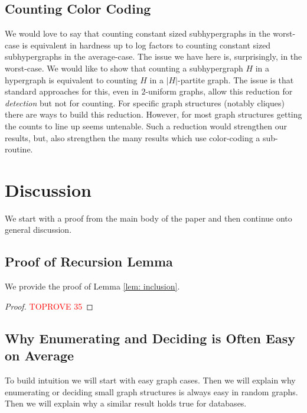 \documentclass[11pt,letterpaper,pdftex]{article}
\begin{document}
\subsection{Counting Color Coding}

We would love to say that counting constant sized subhypergraphs in the worst-case is equivalent in hardness up to log factors to counting constant sized subhypergraphs in the average-case. The issue we have here is, surprisingly, in the worst-case. We would like to show that counting a subhypergraph $H$ in a hypergraph is equivalent to counting $H$ in a $|H|$-partite graph. The issue is that standard approaches for this, even in $2$-uniform graphs, allow this reduction for \emph{detection} but not for counting. For specific graph structures (notably cliques) there are ways to build this reduction. However, for most graph structures getting the counts to line up seems untenable. Such a reduction would strengthen our results, but, also strengthen the many results which use color-coding a sub-routine.  
\let\realbibitem=\bibitem
\def\bibitem{\par \vspace{-0.5ex}\realbibitem}


 

\appendix






\section{Discussion}
\label{sec:appendix_discussion}
We start with a proof from the main body of the paper and then continue onto general discussion. 

\subsection{Proof of Recursion Lemma}
\label{sec: appendixLemmaRecursion}

We provide the proof of Lemma \ref{lem: inclusion}.

\lemmaInclusion*
\begin{proof}\textcolor{red}{TOPROVE 35}\end{proof}

\subsection{Why Enumerating and Deciding  is Often Easy on Average}
\label{subsec:whyEnumIsEasy}
To build intuition we will start with easy graph cases. Then we will explain why enumerating or deciding small graph structures is always easy in random graphs. Then we will explain why a similar result holds true for databases. 
\end{document}
